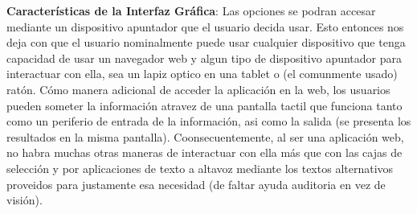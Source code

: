 \textbf{Características de la Interfaz Gráfica}: Las opciones se podran accesar mediante un dispositivo apuntador que el usuario decida usar. Esto entonces nos deja con que el usuario nominalmente puede usar cualquier dispositivo que tenga capacidad de usar un navegador web y algun tipo de dispositivo apuntador para interactuar con ella, sea un lapiz optico en una tablet o (el comunmente usado) ratón. Cómo manera adicional de acceder la aplicación en la web, los usuarios pueden someter la información atravez de una pantalla tactil que funciona tanto como un periferio de entrada de la información, asi como la salida (se presenta los resultados en la misma pantalla). Coonsecuentemente, al ser una aplicación web, no habra muchas otras maneras de interactuar con ella más que con las cajas de selección y por aplicaciones de texto a altavoz mediante los textos alternativos proveidos para justamente esa necesidad (de faltar ayuda auditoria en vez de visión).